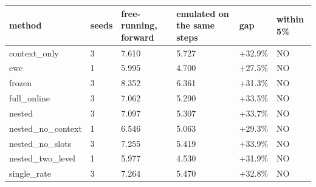 \begin{tabular}{llllll}
\hline
method & seeds & free-running, forward & emulated on the same steps & gap & within 5\% \\
\hline
context\_only & 3 & 7.610 & 5.727 & +32.9\% & NO \\
ewc & 1 & 5.995 & 4.700 & +27.5\% & NO \\
frozen & 3 & 8.352 & 6.361 & +31.3\% & NO \\
full\_online & 3 & 7.062 & 5.290 & +33.5\% & NO \\
nested & 3 & 7.097 & 5.307 & +33.7\% & NO \\
nested\_no\_context & 1 & 6.546 & 5.063 & +29.3\% & NO \\
nested\_no\_slots & 3 & 7.255 & 5.419 & +33.9\% & NO \\
nested\_two\_level & 1 & 5.977 & 4.530 & +31.9\% & NO \\
single\_rate & 3 & 7.264 & 5.470 & +32.8\% & NO \\
\hline
\end{tabular}
